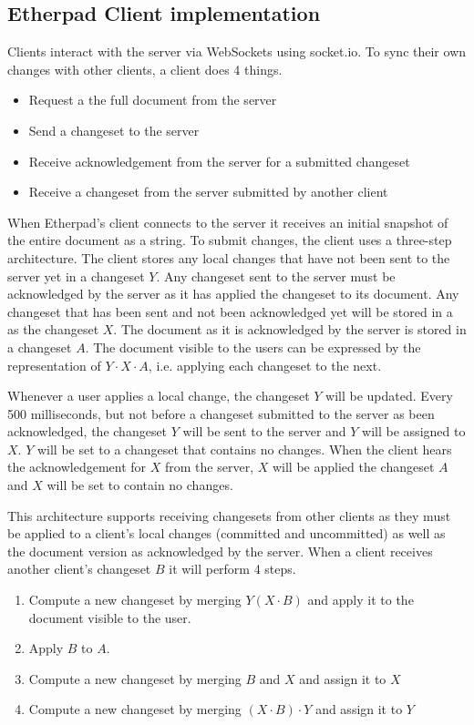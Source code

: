 \subsection{Etherpad Client implementation}

Clients interact with the server via WebSockets using socket.io. To sync their own changes with other clients, a client does 4 things.

\begin{itemize}
\item Request a the full document from the server
\item Send a changeset to the server
\item Receive acknowledgement from the server for a submitted changeset
\item Receive a changeset from the server submitted by another client
\end{itemize}

\noindent When Etherpad's client connects to the server it receives an initial snapshot of the entire document as a string. To submit changes, the client uses a three-step architecture. The client stores any local changes that have not been sent to the server yet in a changeset $Y$. Any changeset sent to the server must be acknowledged by the server as it has applied  the changeset to its document. Any changeset that has been sent and not been acknowledged yet will be stored in a as the changeset $X$. The document as it is acknowledged by the server is stored in a changeset $A$. The document visible to the users can be expressed by the representation of $Y \cdot X \cdot A$, i.e. applying each changeset to the next.

Whenever a user applies a local change, the changeset $Y$ will be updated. Every 500 milliseconds, but not before a changeset submitted to the server as been acknowledged, the changeset $Y$ will be sent to the server and $Y$ will be assigned to $X$. $Y$ will be set to a changeset that contains no changes. When the client hears the acknowledgement for $X$ from the server, $X$ will be applied the changeset $A$ and $X$ will be set to contain no changes.

This architecture supports receiving changesets from other clients as they must be applied to a client's local changes (committed and uncommitted) as well as the document version as acknowledged by the server. When a client receives another client's changeset $B$ it will perform 4 steps.

\begin{enumerate}
\item Compute a new changeset by merging $Y (X \cdot B)$ and apply it to the document visible to the user.
\item Apply $B$ to $A$.
\item Compute a new changeset by merging $B$ and $X$ and assign it to $X$
\item Compute a new changeset by merging $(X \cdot B) \cdot Y$ and assign it to $Y$
\end{enumerate}

